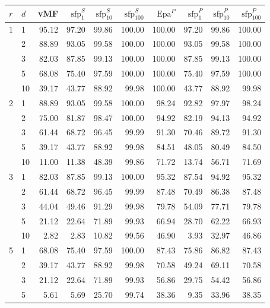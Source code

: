 \documentclass[oneside,11pt]{article}
\begin{document}
\begin{table}[htpb!]
    \centering
    \begin{tabular}{ll|rrrr|rrrr}
    \toprule
    $r$ & $d$ & vMF & $\mathrm{sfp}^{S}_{1}$ & $\mathrm{sfp}^{S}_{10}$ & $\mathrm{sfp}^{S}_{100}$ & $\mathrm{Epa}^{P}$ & $\mathrm{sfp}^{P}_{1}$ & $\mathrm{sfp}^{P}_{10}$ & $\mathrm{sfp}^{P}_{100}$ \\
    \midrule
    1 & 1 & 95.12 & 97.20 & 99.86 & 100.00 & 100.00 & 97.20 & 99.86 & 100.00\\
     & 2 & 88.89 & 93.05 & 99.58 & 100.00 & 100.00 & 93.05 & 99.58 & 100.00\\
     & 3 & 82.03 & 87.85 & 99.13 & 100.00 & 100.00 & 87.85 & 99.13 & 100.00\\
     & 5 & 68.08 & 75.40 & 97.59 & 100.00 & 100.00 & 75.40 & 97.59 & 100.00\\
     & 10 & 39.17 & 43.77 & 88.92 & 99.98 & 100.00 & 43.77 & 88.92 & 99.98\\
    \midrule
    2 & 1 & 88.89 & 93.05 & 99.58 & 100.00 & 98.24 & 92.82 & 97.97 & 98.24\\
     & 2 & 75.00 & 81.87 & 98.47 & 100.00 & 94.92 & 82.19 & 94.13 & 94.92\\
     & 3 & 61.44 & 68.72 & 96.45 & 99.99 & 91.30 & 70.46 & 89.72 & 91.30\\
     & 5 & 39.17 & 43.77 & 88.92 & 99.98 & 84.51 & 48.05 & 80.49 & 84.50\\
     & 10 & 11.00 & 11.38 & 48.39 & 99.86 & 71.72 & 13.74 & 56.71 & 71.69\\
    \midrule
    3 & 1 & 82.03 & 87.85 & 99.13 & 100.00 & 95.32 & 87.54 & 94.92 & 95.32\\
     & 2 & 61.44 & 68.72 & 96.45 & 99.99 & 87.48 & 70.49 & 86.38 & 87.48\\
     & 3 & 44.04 & 49.46 & 91.29 & 99.98 & 79.78 & 54.09 & 77.71 & 79.78\\
     & 5 & 21.12 & 22.64 & 71.89 & 99.93 & 66.94 & 28.70 & 62.22 & 66.93\\
     & 10 & 2.82 & 2.83 & 10.82 & 99.56 & 46.90 & 3.93 & 32.97 & 46.86\\
    \midrule
    5 & 1 & 68.08 & 75.40 & 97.59 & 100.00 & 87.43 & 75.86 & 86.82 & 87.43\\
     & 2 & 39.17 & 43.77 & 88.92 & 99.98 & 70.58 & 49.24 & 69.11 & 70.58\\
     & 3 & 21.12 & 22.64 & 71.89 & 99.93 & 56.86 & 29.75 & 54.42 & 56.86\\
     & 5 & 5.61 & 5.69 & 25.70 & 99.74 & 38.36 & 9.35 & 33.96 & 38.35\\

\end{tabular}
\end{table}
\end{document}
